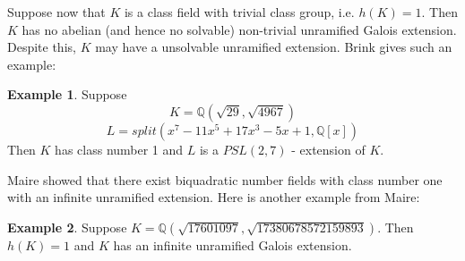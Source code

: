 \documentclass[12pt]{extarticle}
\newcommand{\Q}{\mathbb{Q}}
\newcommand{\<}{\langle}
\renewcommand{\>}{\rangle}
\theoremstyle{definition}
\newtheorem{example}{Example}
\begin{document}
Suppose now that $K$ is a class field with trivial class group, i.e. $h(K)=1$. Then $K$ has no abelian (and hence no
solvable) non-trivial unramified Galois extension. Despite this, $K$ may have a unsolvable unramified extension. Brink \cite{BRINK} gives such an example:
\begin{example}
Suppose
\begin{equation}
   K=\Q(\sqrt{29},\sqrt{4967}) 
\end{equation}
\begin{equation}
   L=split(x^7 - 11x^5 + 17x^3 - 5x + 1,\Q[x])
\end{equation}
Then $K$ has class number 1 and $L$ is a $PSL(2, 7)$ - extension of $K$.
\end{example}

Maire \cite{MAIR} showed that there exist biquadratic number fields with class number one with an infinite unramified extension. Here is another example from Maire: 
\begin{example}
Suppose $K= \Q( \sqrt{17601097}, \sqrt{17380678572159893})$. Then $h(K)=1$ and $K$ has an infinite unramified Galois extension. 
\end{example}
\end{document}
